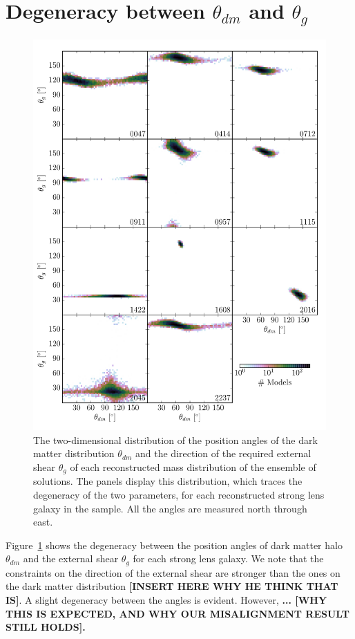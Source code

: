 \documentclass[useAMS,usenatbib]{mn2e}
\begin{document}
\section{Degeneracy between $\theta_{dm}$ and $\theta_{g}$}\label{sec:shearshapedeg}
\begin{figure}
  \centering
  \includegraphics[width=.9\linewidth]{Figures/theta_scatter.pdf}
  \caption[width=\linewidth]{The two-dimensional distribution of the position angles of the dark matter distribution $\theta_{dm}$ and the direction of the required external shear $\theta_{g}$ of each reconstructed mass distribution of the ensemble of solutions. The panels display this distribution, which traces the degeneracy of the two parameters, for each reconstructed strong lens galaxy in the sample. All the angles are measured north through east.}
  \label{fig:thetascatter}
\end{figure}

Figure~\ref{fig:thetascatter} shows the degeneracy between the position angles of dark matter halo $\theta_{dm}$ and the external shear $\theta_{g}$ for each strong lens galaxy. We note that the constraints on the direction of the external shear are stronger than the ones on the dark matter distribution \textbf{[INSERT HERE WHY HE THINK THAT IS]}. A slight degeneracy between the angles is evident. However, \textbf{... [WHY THIS IS EXPECTED, AND WHY OUR MISALIGNMENT RESULT STILL HOLDS].}
\end{document}
